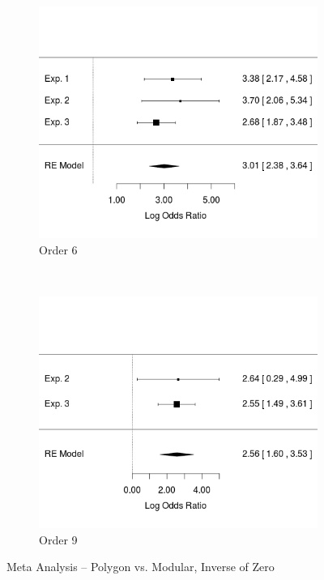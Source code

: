 \documentclass[11pt]{article}
\begin{document}
\begin{figure}[H]
\centering
\begin{subfigure}[c]{0.4\textwidth}
\centering
\includegraphics[width=\textwidth]{figures/meta/p_in_Z_6.png}
\caption{Order 6}
\end{subfigure}
~
\begin{subfigure}[c]{0.4\textwidth}
\centering
\includegraphics[width=\textwidth]{figures/meta/p_in_Z_9.png}
\caption{Order 9}
\end{subfigure}
\caption{Meta Analysis -- Polygon vs. Modular, Inverse of Zero}
\label{meta_inZ_p}
\end{figure}\noindent 
\end{document}
